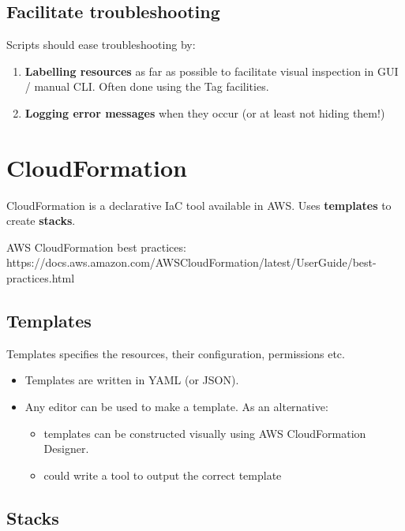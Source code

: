 \documentclass[slides]{pgnotes}
\begin{document}
\subsection{Facilitate troubleshooting}
\label{facilitate-troubleshooting}

Scripts should ease troubleshooting by:

\begin{enumerate}
\item
  \textbf{Labelling resources} as far as possible to facilitate visual
  inspection in GUI / manual CLI. Often done using the Tag facilities.
\item
  \textbf{Logging error messages} when they occur (or at least not
  hiding them!)
\end{enumerate}

\section{CloudFormation}\label{cloudformation}

CloudFormation is a declarative IaC tool available in AWS.
Uses \textbf{templates} to create \textbf{stacks}.

AWS CloudFormation best practices:
https://docs.aws.amazon.com/AWSCloudFormation/latest/UserGuide/best-practices.html


\subsection{Templates}\label{templates}

Templates specifies the resources, their configuration, permissions etc.

\begin{itemize}
\item
  Templates are written in YAML (or JSON).
\item
  Any editor can be used to make a template. As an alternative:

  \begin{itemize}
  \item
    templates can be constructed visually using AWS CloudFormation
    Designer.
  \item
    could write a tool to output the correct template
  \end{itemize}
\end{itemize}

\subsection{Stacks}\label{stacks}
\end{document}
